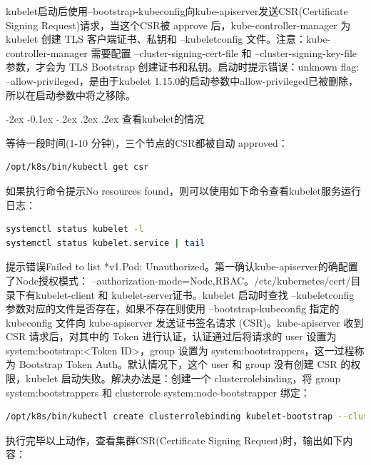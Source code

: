 \documentclass[8pt]{book}
\makeatletter
\numberwithin{dummy}{section}
\theoremstyle{ocrenumbox}
\theoremstyle{blacknumex}
\theoremstyle{blacknumbox}
\theoremstyle{ocrenum}
\renewcommand{\subsubsection}{\@startsection {subsubsection}{3}{\z@}
	{-2ex \@plus -0.1ex \@minus -.2ex}
	{.2ex \@plus.2ex }
	{\normalfont\small\sffamily\bfseries}}
\makeatother
\begin{document}
kubelet启动后使用--bootstrap-kubeconfig向kube-apiserver发送CSR(Certificate Signing Request)请求，当这个CSR被 approve 后，kube-controller-manager 为 kubelet 创建 TLS 客户端证书、私钥和 --kubeletconfig 文件。注意：kube-controller-manager 需要配置 --cluster-signing-cert-file 和 --cluster-signing-key-file 参数，才会为 TLS Bootstrap 创建证书和私钥。启动时提示错误：unknown flag: --allow-privileged，是由于kubelet 1.15.0的启动参数中allow-privileged已被删除，所以在启动参数中将之移除。

\subsubsection{查看kubelet的情况}

等待一段时间(1-10 分钟)，三个节点的CSR都被自动 approved：

\begin{lstlisting}[language=Bash]
/opt/k8s/bin/kubectl get csr
\end{lstlisting}

如果执行命令提示No resources found，则可以使用如下命令查看kubelet服务运行日志：

\begin{lstlisting}[language=Bash]
systemctl status kubelet -l
systemctl status kubelet.service | tail 
\end{lstlisting}

提示错误Failed to list *v1.Pod: Unauthorized。第一确认kube-apiserver的确配置了Node授权模式： --authorization-mode=Node,RBAC。/etc/kubernetes/cert/目录下有kubelet-client 和 kubelet-server证书。kubelet 启动时查找 --kubeletconfig 参数对应的文件是否存在，如果不存在则使用 --bootstrap-kubeconfig 指定的 kubeconfig 文件向 kube-apiserver 发送证书签名请求 (CSR)。kube-apiserver 收到 CSR 请求后，对其中的 Token 进行认证，认证通过后将请求的 user 设置为 system:bootstrap:<Token ID>，group 设置为 system:bootstrappers，这一过程称为 Bootstrap Token Auth。默认情况下，这个 user 和 group 没有创建 CSR 的权限，kubelet 启动失败。解决办法是：创建一个 clusterrolebinding，将 group system:bootstrappers 和 clusterrole system:node-bootstrapper 绑定：

\begin{lstlisting}[language=Bash]
/opt/k8s/bin/kubectl create clusterrolebinding kubelet-bootstrap --clusterrole=system:node-bootstrapper --group=system:bootstrappers
\end{lstlisting}

执行完毕以上动作，查看集群CSR(Certificate Signing Request)时，输出如下内容：
\end{document}
